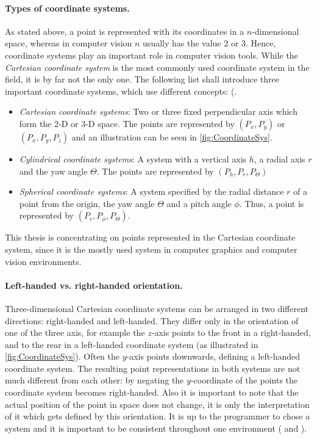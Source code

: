 \paragraph{Types of coordinate systems.}
As stated above, a point is represented with its coordinates in a $n$-dimensional space, whereas in computer vision $n$ usually has the value $2$ or $3$. Hence, coordinate systems play an important role in computer vision tools. While the \textit{Cartesian coordinate system} is the most commonly used coordinate system in the field, it is by far not the only one. The following list shall introduce three important coordinate systems, which use different concepts: (\cite[p.166 et seq.]{Gregory.2014}.  
\begin{itemize}
\item \textit{Cartesian coordinate systems}: Two or three fixed perpendicular axis which form the 2-D or 3-D space. The points are represented by $(P_x,P_y)$ or $(P_x,P_y,P_z)$ and an illustration can be seen in \autoref{fig:CoordinateSys}.  
\item \textit{Cylindrical coordinate systems}: A system with a vertical axis $h$, a radial axis $r$ and the yaw angle $\Theta$. The points are represented by $(P_h,P_r,P_\Theta)$
\item \textit{Spherical coordinate systems}: A system specified by the radial distance $r$ of a point from the origin, the yaw angle $\Theta$ and a pitch angle $\phi$. Thus, a point is represented by $(P_r,P_\phi,P_\Theta)$.
\end{itemize}

This thesis is concentrating on points represented in the Cartesian coordinate system, since it is the mostly used system in computer graphics and computer vision environments.

\paragraph{Left-handed vs. right-handed orientation.}
Three-dimensional Cartesian coordinate systems can be arranged in two different directions: right-handed and left-handed. They differ only in the orientation of one of the three axis, for example the $z$-axis points to the front in a right-handed, and to the rear in a left-handed coordinate system (as illustrated in \autoref{fig:CoordinateSys}). Often the $y$-axis points downwards, defining a left-handed coordinate system. The resulting point representations in both systems are not much different from each other: by negating the $y$-coordinate of the points the coordinate system becomes right-handed. Also it is important to note that the actual position of the point in space does not change, it is only the interpretation of it which gets defined by this orientation. It is up to the programmer to chose a system and it is important to be consistent throughout one environment (\cite[p.164 et seq.]{Hartley.2011} and \cite[p.167 et seq.]{Gregory.2014}). 

